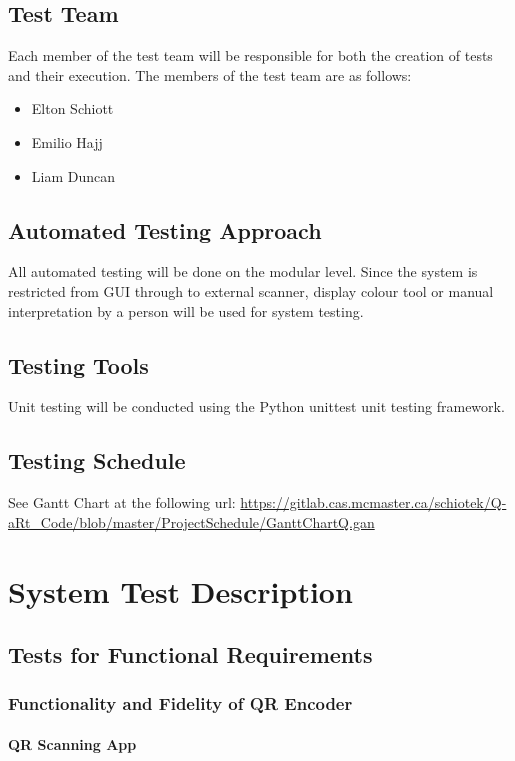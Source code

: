 \documentclass[12pt, titlepage]{article}
\begin{document}
\subsection{Test Team}
	Each member of the test team will be responsible for both the creation of 
	tests and their execution. The members of the test team are as follows:
	\begin{itemize}
		\item Elton Schiott
		\item Emilio Hajj
		\item Liam Duncan
	\end{itemize}
\subsection{Automated Testing Approach}
	All automated testing will be done on the modular level. Since the system is restricted from GUI through to external scanner, display colour tool or manual interpretation by a person will be used for system testing.

\subsection{Testing Tools}
	Unit testing will be conducted using the Python unittest unit testing framework.
\subsection{Testing Schedule}
		
See Gantt Chart at the following url:
\url{https://gitlab.cas.mcmaster.ca/schiotek/Q-aRt_Code/blob/master/ProjectSchedule/GanttChartQ.gan}

\section{System Test Description}
	
\subsection{Tests for Functional Requirements}

\subsubsection{Functionality and Fidelity of QR Encoder}
		
\paragraph{QR Scanning App}
\end{document}
